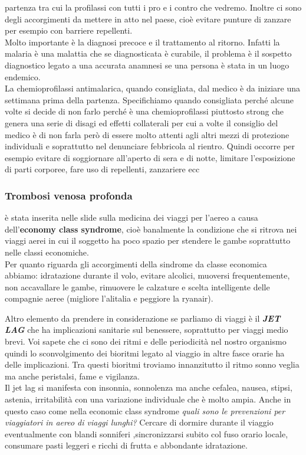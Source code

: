 partenza tra cui la profilassi con tutti i pro e i contro che vedremo.
Inoltre ci sono degli accorgimenti da mettere in atto nel paese, cioè
evitare punture di zanzare per esempio con barriere repellenti.\\
Molto importante è la diagnosi precoce e il trattamento al ritorno.
Infatti la malaria è una malattia che se diagnosticata è curabile, il
problema è il sospetto diagnostico legato a una accurata anamnesi se una
persona è stata in un luogo endemico.\\
La chemioprofilassi antimalarica, quando consigliata, dal medico è da
iniziare una settimana prima della partenza. Specifichiamo quando
consigliata perché alcune volte si decide di non farlo perché è una
chemioprofilassi piuttosto strong che genera una serie di disagi ed
effetti collaterali per cui a volte il consiglio del medico è di non
farla però di essere molto attenti agli altri mezzi di protezione
individuali e soprattutto nel denunciare febbricola al rientro. Quindi
occorre per esempio evitare di soggiornare all'aperto di sera e di
notte, limitare l'esposizione di parti corporee, fare uso di repellenti,
zanzariere ecc

\subsubsection{Trombosi venosa profonda}
è stata inserita nelle slide sulla medicina dei viaggi per l'aereo a
causa dell'\textbf{economy class syndrome}, cioè banalmente la
condizione che si ritrova nei viaggi aerei in cui il soggetto ha poco
spazio per stendere le gambe soprattutto nelle classi economiche.\\
Per quanto riguarda gli accorgimenti della sindrome da classe economica
abbiamo: idratazione durante il volo, evitare alcolici, muoversi
frequentemente, non accavallare le gambe, rimuovere le calzature e
scelta intelligente delle compagnie aeree (migliore l'alitalia e
peggiore la ryanair).

Altro elemento da prendere in considerazione se parliamo di viaggi è il
\textbf{\emph{JET LAG}} che ha implicazioni sanitarie sul benessere,
soprattutto per viaggi medio brevi. Voi sapete che ci sono dei ritmi e
delle periodicità nel nostro organismo quindi lo sconvolgimento dei
bioritmi legato al viaggio in altre fasce orarie ha delle implicazioni.
Tra questi bioritmi troviamo innanzitutto il ritmo sonno veglia ma anche
peristalsi, fame e vigilanza.\\
Il jet lag si manifesta con insonnia, sonnolenza ma anche cefalea,
nausea, stipsi, astenia, irritabilità con una variazione individuale che
è molto ampia. Anche in questo caso come nella economic class syndrome
\emph{quali sono le prevenzioni per viaggiatori in aereo di viaggi
lunghi?} Cercare di dormire durante il viaggio eventualmente con blandi
sonniferi ,sincronizzarsi subito col fuso orario locale, consumare pasti
leggeri e ricchi di frutta e abbondante idratazione.

